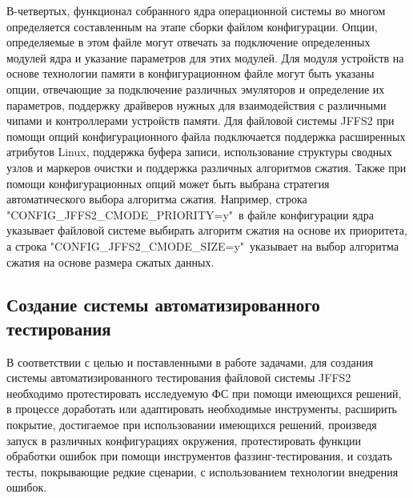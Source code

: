 В-четвертых, функционал собранного ядра операционной системы во многом определяется составленным на этапе сборки файлом конфигурации. Опции, определяемые в этом файле могут отвечать за подключение определенных модулей ядра и указание параметров для этих модулей. Для модуля устройств на основе технологии памяти в конфигурационном файле могут быть указаны опции, отвечающие за подключение различных эмуляторов и определение их параметров, поддержку драйверов нужных для взаимодействия с различными чипами и контроллерами устройств памяти. Для файловой системы JFFS2 при помощи опций конфигурационного файла подключается поддержка расширенных атрибутов Linux, поддержка буфера записи, использование структуры сводных узлов и маркеров очистки и поддержка различных алгоритмов сжатия. Также при помощи конфигурационных опций может быть выбрана стратегия автоматического выбора алгоритма сжатия. Например, строка "CONFIG\_JFFS2\_CMODE\_PRIORITY=y"\ в файле конфигурации ядра указывает файловой системе выбирать алгоритм сжатия на основе их приоритета, а строка "CONFIG\_JFFS2\_CMODE\_SIZE=y"\ указывает на выбор алгоритма сжатия на основе размера сжатых данных.

\subsection{Создание системы автоматизированного тестирования}

В соответствии с целью и поставленными в работе задачами, для создания системы автоматизированного тестирования файловой системы JFFS2 необходимо протестировать исследуемую ФС при помощи имеющихся решений, в процессе доработать или адаптировать необходимые инструменты, расширить покрытие, достигаемое при использовании имеющихся решений, произведя запуск в различных конфигурациях окружения, протестировать функции обработки ошибок при помощи инструментов фаззинг-тестирования, и создать тесты, покрывающие редкие сценарии, с использованием технологии внедрения ошибок.

\newpage
